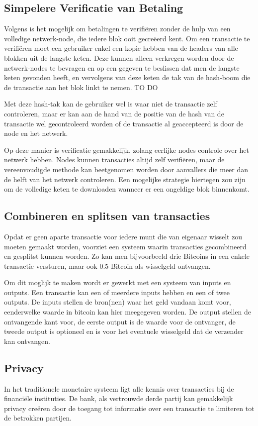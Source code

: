 		\subsection{Simpelere Verificatie van Betaling}
		Volgens \textcite{Nakamoto2008} is het mogelijk om betalingen te verifiëren zonder de hulp van een volledige netwerk-node, die iedere blok ooit gecreëerd kent. Om een transactie te verifiëren moet een gebruiker enkel een kopie hebben van de headers van alle blokken uit de langste keten. Deze kunnen alleen verkregen worden door de netwerk-nodes te bevragen en op een gegeven te beslissen dat men de langste keten gevonden heeft, en vervolgens van deze keten de tak van de hash-boom die de transactie aan het blok linkt te nemen.  TO DO
	
		Met deze hash-tak kan de gebruiker wel is waar niet de transactie zelf controleren, maar er kan aan de hand van de positie van de hash van de transactie wel gecontroleerd worden of de transactie al geaccepteerd is door de node en het netwerk.
		
		Op deze manier is verificatie gemakkelijk, zolang eerlijke nodes controle over het netwerk hebben. Nodes kunnen transacties altijd zelf verifiëren, maar de vereenvoudigde methode kan beetgenomen worden door aanvallers die meer dan de helft van het netwerk controleren. Een mogelijke strategie hiertegen zou zijn om de volledige keten te downloaden wanneer er een ongeldige blok binnenkomt. 
	\subsection{Combineren en splitsen van transacties}
	Opdat er geen aparte transactie voor iedere munt die van eigenaar wisselt zou moeten gemaakt worden, voorziet \textcite{Nakamoto2008} een systeem waarin transacties gecombineerd en gesplitst kunnen worden. Zo kan men bijvoorbeeld drie Bitcoins in een enkele transactie versturen, maar ook 0.5 Bitcoin als wisselgeld ontvangen.
	
	Om dit moglijk te maken wordt er gewerkt met een systeem van inputs en outputs. Een transactie kan een of meerdere inputs hebben en een of twee outputs. De inputs stellen de bron(nen) waar het geld vandaan komt voor, eenderwelke waarde in bitcoin kan hier meegegeven worden. De output stellen de ontvangende kant voor, de eerste output is de waarde voor de ontvanger, de tweede output is optioneel en is voor het eventuele wisselgeld dat de verzender kan ontvangen.
	\subsection{Privacy}
	In het traditionele monetaire systeem ligt alle kennis over transacties bij de financiële instituties. De bank, als vertrouwde derde partij kan gemakkelijk privacy creëren door de toegang tot informatie over een transactie te limiteren tot de betrokken partijen. 
	
